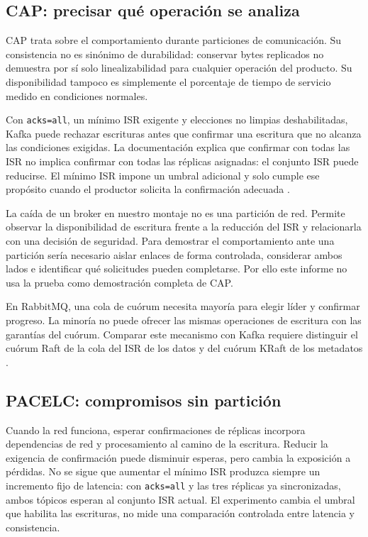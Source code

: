 \documentclass[11pt,a4paper]{article}
\begin{document}
\subsection{CAP: precisar qué operación se analiza}
CAP trata sobre el comportamiento durante particiones de comunicación. Su consistencia no es sinónimo de durabilidad: conservar bytes replicados no demuestra por sí solo linealizabilidad para cualquier operación del producto. Su disponibilidad tampoco es simplemente el porcentaje de tiempo de servicio medido en condiciones normales.

Con \texttt{acks=all}, un mínimo ISR exigente y elecciones no limpias deshabilitadas, Kafka puede rechazar escrituras antes que confirmar una escritura que no alcanza las condiciones exigidas. La documentación explica que confirmar con todas las ISR no implica confirmar con todas las réplicas asignadas: el conjunto ISR puede reducirse. El mínimo ISR impone un umbral adicional y solo cumple ese propósito cuando el productor solicita la confirmación adecuada \cite{kafka391design}.

La caída de un broker en nuestro montaje no es una partición de red. Permite observar la disponibilidad de escritura frente a la reducción del ISR y relacionarla con una decisión de seguridad. Para demostrar el comportamiento ante una partición sería necesario aislar enlaces de forma controlada, considerar ambos lados e identificar qué solicitudes pueden completarse. Por ello este informe no usa la prueba como demostración completa de CAP.

En RabbitMQ, una cola de cuórum necesita mayoría para elegir líder y confirmar progreso. La minoría no puede ofrecer las mismas operaciones de escritura con las garantías del cuórum. Comparar este mecanismo con Kafka requiere distinguir el cuórum Raft de la cola del ISR de los datos y del cuórum KRaft de los metadatos \cite{rabbitquorum}.

\subsection{PACELC: compromisos sin partición}
Cuando la red funciona, esperar confirmaciones de réplicas incorpora dependencias de red y procesamiento al camino de la escritura. Reducir la exigencia de confirmación puede disminuir esperas, pero cambia la exposición a pérdidas. No se sigue que aumentar el mínimo ISR produzca siempre un incremento fijo de latencia: con \texttt{acks=all} y las tres réplicas ya sincronizadas, ambos tópicos esperan al conjunto ISR actual. El experimento cambia el umbral que habilita las escrituras, no mide una comparación controlada entre latencia y consistencia.
\end{document}
